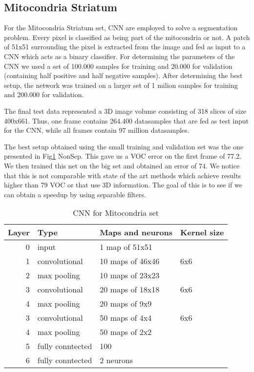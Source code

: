 
\subsection{Mitocondria Striatum}
For the Mitocondria Striatum set, CNN are employed to solve a segmentation problem. Every pixel is classified as being part of the mitocondria or not. A patch of 51x51 surrounding the pixel is extracted from the image and fed as input to a CNN which acts as a binary classifier. For determining the parameters of the CNN we used a set of
100.000 samples for training and 20.000 for validation (containing half positive and half negative samples). After determining the best setup, the network was trained on a larger set of 1 milion samples for training and 200.000 for validation.

The final test data represented a 3D image volume consisting of 318 slices of size 400x661. Thus, one frame contains 264.400 datasamples that are fed as test input for the CNN, while all frames contain 97 million datasamples.

The best setup obtained using the small training and validation set was the one presented in Fig\ref{fig:CNN3} NonSep. This gave us a VOC error on the first frame of 77.2. We then trained this net on the big set and obtained an error of 74. We notice that this is not comparable with state of the art methods which achieve results higher than 79 VOC or that use 3D information. The goal of this
is to see if we can obtain a speedup by using separable filters.

\begin{table}
\centering
\begin{tabular}{@{}rlll@{}}\toprule
Layer & Type & Maps and neurons& Kernel size \\ \midrule
0 & input & 1 map of 51x51 &\\
1& convolutional & 10 maps of 46x46 & 6x6\\
2 & max pooling & 10 maps of 23x23 &  \\
3 & convolutional & 20 maps of 18x18& 6x6 \\
4 & max pooling & 20 maps of 9x9& \\ 
3 & convolutional & 50 maps of 4x4& 6x6 \\
4 & max pooling & 50 maps of 2x2& \\ 
5 & fully conntected& 100 & \\
6 & fully conntected & 2 neurons & \\ \bottomrule
\end{tabular}
\caption{CNN for Mitocondria set}
\label{fig:CNN3}
\end{table}

